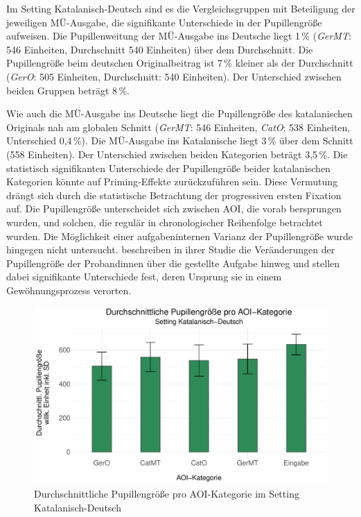 Im Setting Katalanisch-Deutsch sind es die Vergleichsgruppen mit Beteiligung der jeweiligen MÜ-Ausgabe, die signifikante Unterschiede in der Pupillengröße aufweisen. Die Pupillenweitung der MÜ-Ausgabe ins Deutsche liegt 1\,\% (\emph{GerMT}: 546 Einheiten, Durchschnitt 540 Einheiten) über dem Durchschnitt. Die Pupillengröße beim deutschen Originalbeitrag ist 7\,\% kleiner als der Durchschnitt (\emph{GerO}: 505 Einheiten, Durchschnitt: 540 Einheiten). Der Unterschied zwischen beiden Gruppen beträgt 8\,\%.

Wie auch die MÜ-Ausgabe ins Deutsche liegt die Pupillengröße des katalanischen Originals nah am globalen Schnitt (\emph{GerMT}: 546 Einheiten, \emph{CatO}: 538 Einheiten, Unterschied 0,4\,\%). Die MÜ-Ausgabe ins Katalanische liegt 3\,\% über dem Schnitt (558 Einheiten). Der Unterschied zwischen beiden Kategorien beträgt 3,5\,\%. Die statistisch signifikanten Unterschiede der Pupillengröße beider katalanischen Kategorien könnte auf Priming-Effekte zurückzuführen sein. Diese Vermutung drängt sich durch die statistische Betrachtung der progressiven ersten Fixation auf. Die Pupillengröße unterscheidet sich zwischen AOI, die vorab bersprungen wurden, und solchen, die regulär in chronologischer Reihenfolge betrachtet wurden. Die Möglichkeit einer aufgabeninternen Varianz der Pupillengröße wurde hingegen nicht untersucht. \citet[6\psq]{hyona_pupil_1995} beschreiben in ihrer Studie die Veränderungen der Pupillengröße der Proband{\textperiodcentered}innen über die gestellte Aufgabe hinweg und stellen dabei signifikante Unterschiede fest, deren Ursprung sie in einem Gewöhnungsprozess verorten.


\begin{figure}
	\includegraphics[width=.85\textwidth]{Figures/EyeTracking/CatDe/ggplot_catde_meanPSize_de}
	\caption{Durchschnittliche Pupillengröße pro AOI-Kategorie im Setting Katalanisch-Deutsch}
	\label{K6:fig:CatDe:mean-error-psize}
\end{figure}

